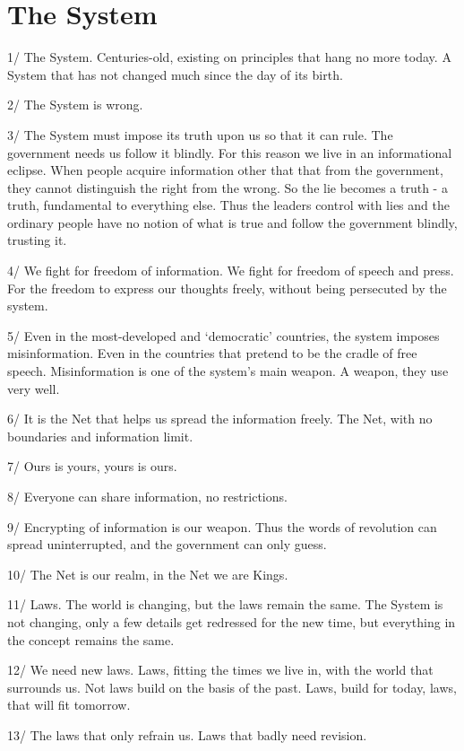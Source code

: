 \documentclass[letterpaper,12pt,english]{sphinxmanual}
\begin{document}
\section{The System}
\label{1997:the-system}
1/ The System. Centuries-old, existing on principles that hang no more today. A System that has not changed much since the day of its birth.

2/ The System is wrong.

3/ The System must impose its truth upon us so that it can rule. The government needs us follow it blindly. For this reason we live in an informational eclipse. When people acquire information other that that from the government, they cannot distinguish the right from the wrong. So the lie becomes a truth - a truth, fundamental to everything else. Thus the leaders control with lies and the ordinary people have no notion of what is true and follow the government blindly, trusting it.

4/ We fight for freedom of information. We fight for freedom of speech and press. For the freedom to express our thoughts freely, without being persecuted by the system.

5/ Even in the most-developed and `democratic' countries, the system imposes misinformation. Even in the countries that pretend to be the cradle of free speech. Misinformation is one of the system's main weapon. A weapon, they use very well.

6/ It is the Net that helps us spread the information freely. The Net, with no boundaries and information limit.

7/ Ours is yours, yours is ours.

8/ Everyone can share information, no restrictions.

9/ Encrypting of information is our weapon. Thus the words of revolution can spread uninterrupted, and the government can only guess.

10/ The Net is our realm, in the Net we are Kings.

11/ Laws. The world is changing, but the laws remain the same. The System is not changing, only a few details get redressed for the new time, but everything in the concept remains the same.

12/ We need new laws. Laws, fitting the times we live in, with the world that surrounds us. Not laws build on the basis of the past. Laws, build for today, laws, that will fit tomorrow.

13/ The laws that only refrain us. Laws that badly need revision.
\end{document}
